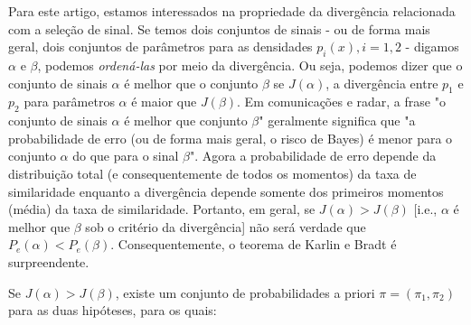 \documentclass{sbrt2017port}
\begin{document}
Para este artigo, estamos interessados na propriedade da divergência relacionada com a seleção de sinal. Se temos dois conjuntos de sinais - ou de forma mais geral, dois conjuntos de parâmetros para as densidades $p_i(x),i = 1,2$ - digamos $\alpha$ e $\beta$, podemos \textit{ordená-las} por meio da divergência. Ou seja, podemos dizer que o conjunto de sinais $\alpha$ é melhor que o conjunto $\beta$ se $J(\alpha)$, a divergência entre $p_1$ e $p_2$ para parâmetros $\alpha$ é maior que $J(\beta)$. Em comunicações e radar, a frase "o conjunto de sinais $\alpha$ é melhor que conjunto $\beta$" geralmente significa que "a probabilidade de erro (ou de forma mais geral, o risco de Bayes) é menor para o conjunto $\alpha$ do que para o sinal $\beta$". Agora a probabilidade de erro depende da distribuição total (e consequentemente de todos os momentos) da taxa de similaridade enquanto a divergência depende somente dos primeiros momentos (média) da taxa de similaridade. Portanto, em geral, se $J(\alpha) > J(\beta)
$ [i.e., $\alpha$ é melhor que $\beta$ sob o critério da divergência] não será verdade que $P_e(\alpha) < P_e(\beta)$. Consequentemente, o teorema de Karlin e Bradt \cite{r18} é surpreendente.


Se $J(\alpha) > J(\beta)$, existe um conjunto de probabilidades a priori $\pi = (\pi_1,\pi_2)$ para as duas hipóteses, para os quais:
\end{document}
